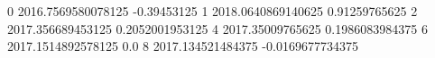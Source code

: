 0 2016.7569580078125 -0.39453125
1 2018.0640869140625 0.91259765625
2 2017.356689453125 0.2052001953125
4 2017.35009765625 0.1986083984375
6 2017.1514892578125 0.0
8 2017.134521484375 -0.0169677734375
